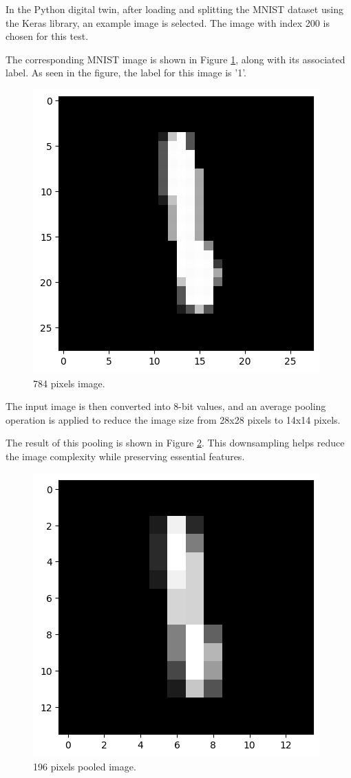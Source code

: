 \documentclass[11pt]{report}
\begin{document}
In the Python digital twin, after loading and splitting the MNIST dataset using the Keras library, an example image is selected. The image with index 200 is chosen for this test. 

The corresponding MNIST image is shown in Figure \ref{fig:mnist_image}, along with its associated label. As seen in the figure, the label for this image is '1'.

\begin{figure}[!h]
    \centering
    \includegraphics[width=0.6\linewidth]{images/neural_network/digital_twin_784_input.png}
    \caption{784 pixels image.}
    \label{fig:mnist_image}
\end{figure}

The input image is then converted into 8-bit values, and an average pooling operation is applied to reduce the image size from 28x28 pixels to 14x14 pixels. 

The result of this pooling is shown in Figure \ref{fig:pooled_image}. This downsampling helps reduce the image complexity while preserving essential features.

\begin{figure}[!h]
    \centering
    \includegraphics[width=0.6\linewidth]{images/neural_network/digital_twin_196_input.png}
    \caption{196 pixels pooled image.}
    \label{fig:pooled_image}
\end{figure}
\end{document}
